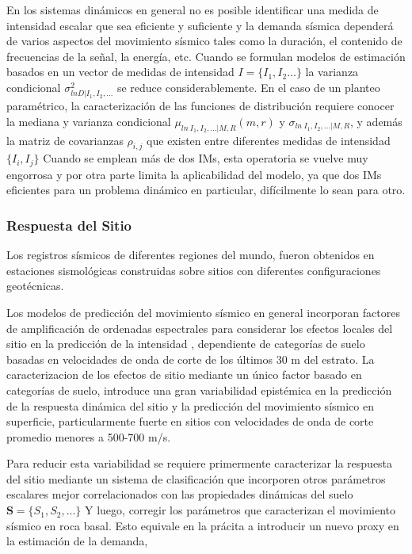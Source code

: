\documentclass[
]{krantz}
\begin{document}
En los sistemas dinámicos en general no es posible identificar una medida de intensidad escalar que sea eficiente y suficiente y la demanda sísmica dependerá de varios aspectos del movimiento sísmico tales como la duración, el contenido de frecuencias de la señal, la energía, etc. Cuando se formulan modelos de estimación basados en un vector de medidas de intensidad \(I=\{I_1,I_2...\}\) la varianza condicional \(\sigma_{ln D|I_1,I_2,...}^2\) se reduce considerablemente. En el caso de un planteo paramétrico, la caracterización de las funciones de distribución requiere conocer la mediana y varianza condicional \(\mu_{ln \ I_1,I_2,...|M,R}(m,r)\) y \(\sigma_{ln \ I_1,I_2,...|M,R}\), y además la matriz de covarianzas \(\rho_{i,j}\) que existen entre diferentes medidas de intensidad \(\{I_i,I_j \}\) Cuando se emplean más de dos IMs, esta operatoria se vuelve muy engorrosa y por otra parte limita la aplicabilidad del modelo, ya que dos IMs eficientes para un problema dinámico en particular, difícilmente lo sean para otro.

\hypertarget{respuesta-del-sitio}{%
\subsubsection*{Respuesta del Sitio}\label{respuesta-del-sitio}}

Los registros sísmicos de diferentes regiones del mundo, fueron obtenidos en estaciones sismológicas construidas sobre sitios con diferentes configuraciones geotécnicas.

Los modelos de predicción del movimiento sísmico en general incorporan factores de amplificación de ordenadas espectrales para considerar los efectos locales del sitio en la predicción de la intensidad , dependiente de categorías de suelo basadas en velocidades de onda de corte de los últimos 30 m del estrato. La caracterizacion de los efectos de sitio mediante un único factor basado en categorías de suelo, introduce una gran variabilidad epistémica en la predicción de la respuesta dinámica del sitio y la predicción del movimiento sísmico en superficie, particularmente fuerte en sitios con velocidades de onda de corte promedio menores a 500-700 m/s.

Para reducir esta variabilidad se requiere primermente caracterizar la respuesta del sitio mediante un sistema de clasificación que incorporen otros parámetros escalares mejor correlacionados con las propiedades dinámicas del suelo \(\pmb S = \{ S_1, S_2, ... \}\) Y luego, corregir los parámetros que caracterizan el movimiento sísmico en roca basal. Esto equivale en la prácita a introducir un nuevo proxy en la estimación de la demanda,
\end{document}
